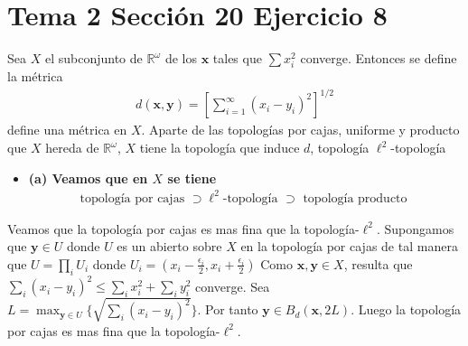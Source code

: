 \documentclass{article}
\newcommand{\vect}[1]{\boldsymbol{#1}}
\begin{document}
\section{Tema 2 Sección 20 Ejercicio 8}
Sea $X$ el subconjunto de $\mathbb{R}^\omega$ de los $\vect{x}$ tales que $\sum x_i^2$ converge. Entonces se define la métrica
\begin{eqnarray}
d(\vect{x},\vect{y})=\left[\sum^{\infty}_{i=1}\left(x_i-y_i\right)^2\right]^{1/2}\nonumber
\end{eqnarray}
define una métrica en $X$. Aparte de las topologías por cajas, uniforme y producto que $X$ hereda de $\mathbb{R}^\omega$, $X$ tiene la topología que induce $d$, topología $\ell^2$-topología
\begin{itemize}
\item \bf (a) \rm Veamos que en $X$ se tiene 
\begin{eqnarray}
\text{topología por cajas }\supset \ell^2\text{-topología }\supset\text{ topología producto }\nonumber
\end{eqnarray}
\end{itemize}
Veamos que la topología por cajas es mas fina que la topología-$\ell^2$. Supongamos que $\vect{y}\in U$ donde $U$ es un abierto sobre $X$ en la topología por cajas de tal manera que $U=\prod_i U_i$ donde $U_i=(x_i-\frac{\epsilon_i}{2},x_i+\frac{\epsilon_i}{2})$ Como $\vect{x},\vect{y}\in X$, resulta que $\sum_i (x_i-y_i)^2\leq \sum_i x_i^2+\sum_i y_i^2 $ converge. Sea $L=\max_{\vect{y}\in U}\{\sqrt{\sum_i (x_i-y_i)^2}\}$. Por tanto $\vect{y}\in B_d(\vect{x},2L)$. Luego la topología por cajas es mas fina que la topología-$\ell^2$.
\end{document}
